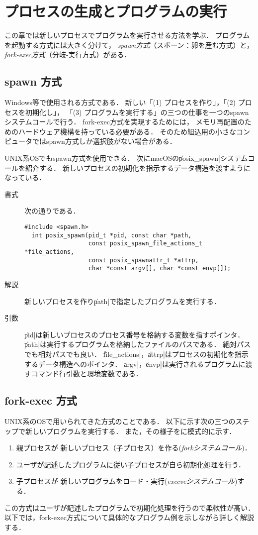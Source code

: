\chapter{プロセスの生成とプログラムの実行}
この章では新しいプロセスでプログラムを実行させる方法を学ぶ．
プログラムを起動する方式には大きく分けて，
\emph{spawn方式}（スポーン：卵を産む方式）と，
\emph{fork-exec方式}（分岐-実行方式）がある．

\section{spawn 方式}
Windows等で使用される方式である．
新しい「(1) プロセスを作り」，「(2) プロセスを初期化し」，
「(3) プログラムを実行する」の三つの仕事を一つのspawnシステムコールで行う．
fork-exec方式を実現するためには，
メモリ再配置のためのハードウェア機構を持っている必要がある．
そのため組込用の小さなコンピュータではspawn方式しか選択肢がない場合がある．

UNIX系OSでもspawn方式を使用できる．
次にmacOSの\|posix_spawn|システムコールを紹介する．
新しいプロセスの初期化を指示するデータ構造を渡すようになっている．

\begin{description}
\item[書式] 次の通りである．
\begin{lstlisting}[numbers=none]
  #include <spawn.h>
  int posix_spawn(pid_t *pid, const char *path,
                  const posix_spawn_file_actions_t *file_actions,
                  const posix_spawnattr_t *attrp,
                  char *const argv[], char *const envp[]);
\end{lstlisting}

\item[解説]
  新しいプロセスを作り\|path|で指定したプログラムを実行する．

\item[引数]
  \|pid|は新しいプロセスのプロセス番号を格納する変数を指すポインタ．
  \|path|は実行するプログラムを格納したファイルのパスである．
  絶対パスでも相対パスでも良い．
  \|file_actions|，\|attrp|はプロセスの初期化を指示するデータ構造へのポインタ．
  \|argv|，\|envp|は実行されるプログラムに渡すコマンド行引数と環境変数である．
\end{description}

\section{fork-exec 方式}
UNIX系のOSで用いられてきた方式のことである．
以下に示す次の三つのステップで新しいプログラムを実行する．
また，その様子をに模式的に示す．
\begin{enumerate}
\item 親プロセスが
  新しいプロセス（子プロセス）を作る(\emph{forkシステムコール})．
\item ユーザが記述したプログラムに従い子プロセスが自ら初期化処理を行う．
\item 子プロセスが
  新しいプログラムをロード・実行(\emph{execveシステムコール})する．
\end{enumerate}
この方式はユーザが記述したプログラムで初期化処理を行うので柔軟性が高い．
以下では，fork-exec方式について具体的なプログラム例を示しながら詳しく解説する．

